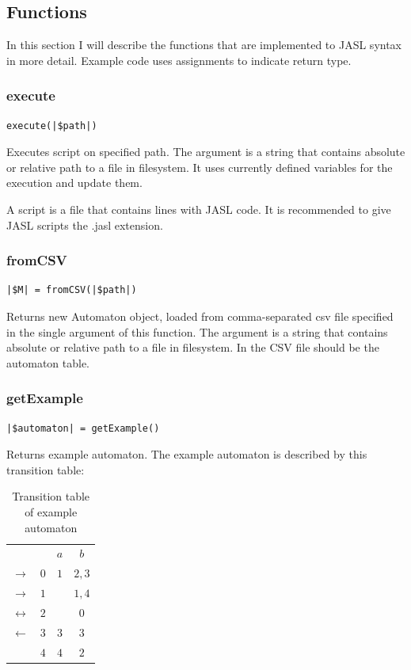\documentclass{ctuthesis}
\begin{document}
\subsection{Functions}
\label{sec:functions}
In this section I will describe the functions that are implemented to JASL syntax in more detail. Example code uses assignments to indicate return type.

\subsubsection{execute}
\label{subsec:execute}
\begin{lstlisting}[language = JASL_snippet]
	execute(|$path|)
\end{lstlisting}

Executes script on specified path. The argument is a string that contains absolute or relative path to a file in filesystem. It uses currently defined variables for the execution and update them.

A script is a file that contains lines with JASL code. It is recommended to give JASL scripts the .jasl extension.

\subsubsection{fromCSV}
\begin{lstlisting}[language = JASL_snippet]
	|$M| = fromCSV(|$path|)
\end{lstlisting}

Returns new Automaton object, loaded from comma-separated csv file specified in the single argument of this function. The argument is a string that contains absolute or relative path to a file in filesystem. In the CSV file should be the automaton table.

\subsubsection{getExample}
\begin{lstlisting}[language = JASL_snippet]
	|$automaton| = getExample()
\end{lstlisting}

Returns example automaton. The example automaton is described by this transition table:
\begin{table}[H]
\begin{ctucolortab}
\begin{tabular}{cc|c|c}
	 & & $a$ & $b$ \\\Midrule
	$\rightarrow$ & $0$ & $1$ & $2,3$ \\
	$\rightarrow$ & $1$ & & $1,4$ \\
	$\leftrightarrow$ & $2$ & & $0$ \\
	$\leftarrow$ & $3$ & $3$ & $3$ \\
	 & $4$ & $4$ & $2$ 
\end{tabular}
\end{ctucolortab}
\caption{Transition table of example automaton}
\label{fig:example_automaton_table}
\end{table}
\end{document}

